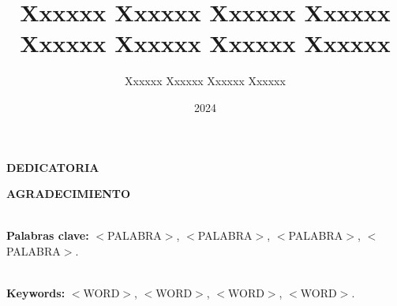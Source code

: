 \documentclass[11pt,a4paper, oneside]{book}
\title{Xxxxxx Xxxxxx Xxxxxx Xxxxxx Xxxxxx Xxxxxx Xxxxxx Xxxxxx}
\author{Xxxxxx Xxxxxx Xxxxxx Xxxxxx}
\date{2024}
\begin{document}
\maketitle

\newpage
\thispagestyle{plain}
\begin{center}
\textbf{DEDICATORIA}
\vspace{1cm}
\end{center}
\lipsum[100] 

\newpage
\thispagestyle{plain}
\begin{center}
\textbf{AGRADECIMIENTO}
\vspace{1cm}
\end{center}
\lipsum[100] 
\newpage

\renewcommand\tablename{\textbf{Tabla}}
\renewcommand\figurename{\textbf{Ilustración}}
\renewcommand*\contentsname{\normalsize ÍNDICE DE CONTENIDO}
\renewcommand{\listfigurename}{\normalsize \hspace{-0.2cm}ÍNDICE DE ILUSTRACIONES}
\renewcommand{\listtablename}{\normalsize ÍNDICE DE TABLAS}
\tableofcontents
\newpage
\listoftables
{}
\newpage
\listoffigures
{}
\newpage
\listofappendices
{}


\newpage
\pagestyle{plain}
\begin{Resumen}
\lipsum[100] \lipsum[100] \lipsum[100] \\

\textbf{Palabras clave:} $<$PALABRA$>$, $<$PALABRA$>$, $<$PALABRA$>$, $<$PALABRA$>$.
\end{Resumen}

\newpage
{}
\pagestyle{plain}
\begin{Abstract}
\lipsum[100] \lipsum[100] \lipsum[100]\\

\textbf{Keywords:} $<$WORD$>$, $<$WORD$>$, $<$WORD$>$, $<$WORD$>$. 
\end{Abstract}
\newpage

\end{document}
